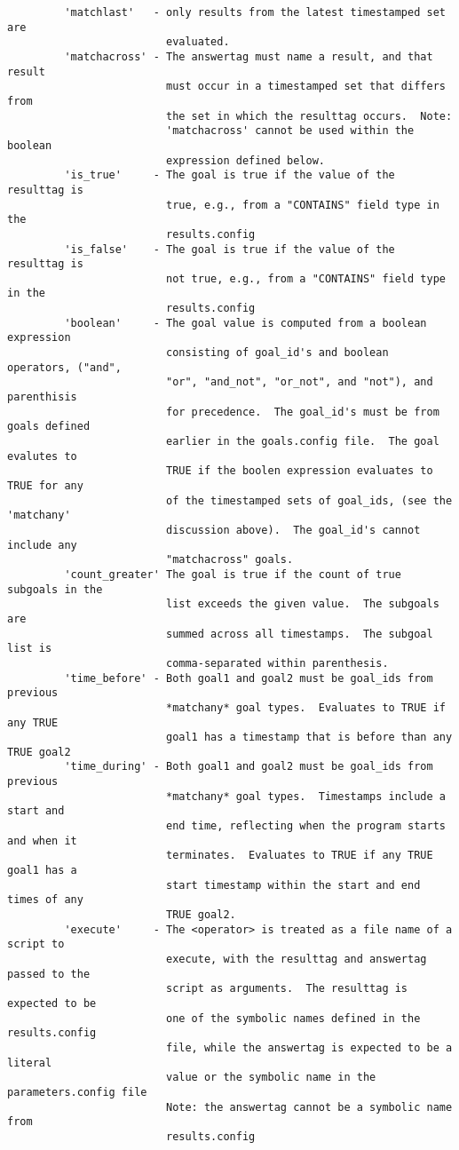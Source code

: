 \documentclass[12pt]{article}
\begin{document}
\begin{verbatim}
         'matchlast'   - only results from the latest timestamped set are 
                         evaluated.
         'matchacross' - The answertag must name a result, and that result 
                         must occur in a timestamped set that differs from 
                         the set in which the resulttag occurs.  Note: 
                         'matchacross' cannot be used within the boolean  
                         expression defined below.
         'is_true'     - The goal is true if the value of the resulttag is 
                         true, e.g., from a "CONTAINS" field type in the 
                         results.config
         'is_false'    - The goal is true if the value of the resulttag is 
                         not true, e.g., from a "CONTAINS" field type in the 
                         results.config
         'boolean'     - The goal value is computed from a boolean expression 
                         consisting of goal_id's and boolean operators, ("and", 
                         "or", "and_not", "or_not", and "not"), and parenthisis 
                         for precedence.  The goal_id's must be from goals defined 
                         earlier in the goals.config file.  The goal evalutes to 
                         TRUE if the boolen expression evaluates to TRUE for any
                         of the timestamped sets of goal_ids, (see the 'matchany' 
                         discussion above).  The goal_id's cannot include any 
                         "matchacross" goals.
         'count_greater' The goal is true if the count of true subgoals in the 
                         list exceeds the given value.  The subgoals are 
                         summed across all timestamps.  The subgoal list is 
                         comma-separated within parenthesis.
         'time_before' - Both goal1 and goal2 must be goal_ids from previous 
                         *matchany* goal types.  Evaluates to TRUE if any TRUE 
                         goal1 has a timestamp that is before than any TRUE goal2
         'time_during' - Both goal1 and goal2 must be goal_ids from previous 
                         *matchany* goal types.  Timestamps include a start and 
                         end time, reflecting when the program starts and when it 
                         terminates.  Evaluates to TRUE if any TRUE goal1 has a 
                         start timestamp within the start and end times of any 
                         TRUE goal2.
         'execute'     - The <operator> is treated as a file name of a script to 
                         execute, with the resulttag and answertag passed to the 
                         script as arguments.  The resulttag is expected to be 
                         one of the symbolic names defined in the results.config 
                         file, while the answertag is expected to be a literal 
                         value or the symbolic name in the parameters.config file 
                         Note: the answertag cannot be a symbolic name from 
                         results.config 
 

\end{verbatim}
\end{document}
